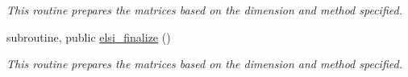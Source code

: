 \begin{DoxyCompactItemize}
\begin{DoxyCompactList}\small\item\em This routine prepares the matrices based on the dimension and method specified. \end{DoxyCompactList}\item 
\hypertarget{namespaceelsi_aa635e42ca93ef9def165bccd1647031e}{}subroutine, public \hyperlink{namespaceelsi_aa635e42ca93ef9def165bccd1647031e}{elsi\+\_\+finalize} ()\label{namespaceelsi_aa635e42ca93ef9def165bccd1647031e}

\begin{DoxyCompactList}\small\item\em This routine prepares the matrices based on the dimension and method specified. \end{DoxyCompactList}\end{DoxyCompactItemize}
